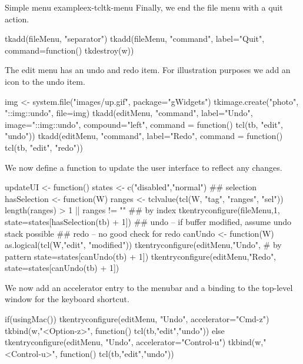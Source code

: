 \begin{example}{Simple menu example}{ex-tcltk-menu}
Finally, we end the file menu with a quit action. 
\begin{Schunk}
\begin{Sinput}
 tkadd(fileMenu, "separator")
 tkadd(fileMenu, "command", label="Quit", 
       command=function() tkdestroy(w))
\end{Sinput}
\end{Schunk}

The edit menu has an undo and redo item. For illustration purposes we add an icon to the undo item.
\begin{Schunk}
\begin{Sinput}
 img <- system.file("images/up.gif", package="gWidgets")
 tkimage.create("photo", "::img::undo", 
                      file=img)
 tkadd(editMenu, "command", label="Undo",
       image="::img::undo", compound="left",
       command = function() tcl(tb, "edit", "undo"))
 tkadd(editMenu, "command", label="Redo",
       command = function() tcl(tb, "edit", "redo"))
\end{Sinput}
\end{Schunk}

We now define a function to update the user interface to reflect any changes.
\begin{Schunk}
\begin{Sinput}
 updateUI <- function() {
   states <- c("disabled","normal")
   ## selection
   hasSelection <- function(W) {
     ranges <- tclvalue(tcl(W, "tag", "ranges", "sel"))
     length(ranges) > 1 || ranges != ""
   }
   ## by index  
   tkentryconfigure(fileMenu,1,  
                    state=states[hasSelection(tb) + 1]) 
   ## undo -- if buffer modified, assume undo stack possible
   ## redo -- no good check for redo
   canUndo <- function(W) as.logical(tcl(W,"edit", "modified"))
   tkentryconfigure(editMenu,"Undo",     # by pattern
                    state=states[canUndo(tb) + 1])
   tkentryconfigure(editMenu,"Redo", 
                    state=states[canUndo(tb) + 1])
 }
\end{Sinput}
\end{Schunk}

We now add an accelerator entry to the menubar and a binding to the top-level window for the keyboard shortcut.
\begin{Schunk}
\begin{Sinput}
 if(usingMac()) {
   tkentryconfigure(editMenu, "Undo", accelerator="Cmd-z")
   tkbind(w,"<Option-z>", function() tcl(tb,"edit","undo"))
 } else {
   tkentryconfigure(editMenu, "Undo", accelerator="Control-u")
   tkbind(w,"<Control-u>", function() tcl(tb,"edit","undo"))
 }
\end{Sinput}
\end{Schunk}


\end{example}
